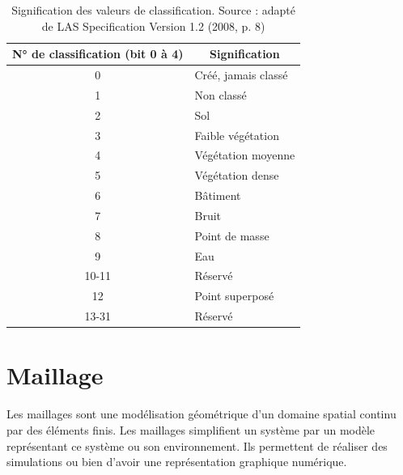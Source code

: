 \begin{table}[htbp!]
\centering
\begin{tabular}{|c|l|}
\hline
\textbf{N° de classification (bit 0 à 4)} & \multicolumn{1}{c|}{\textbf{Signification}} \\ \hline
0                                         & Créé, jamais classé                         \\ \hline
1                                         & Non classé                                  \\ \hline
2                                         & Sol                                         \\ \hline
3                                         & Faible végétation                           \\ \hline
4                                         & Végétation moyenne                          \\ \hline
5                                         & Végétation dense                            \\ \hline
6                                         & Bâtiment                                    \\ \hline
7                                         & Bruit                                       \\ \hline
8                                         & Point de masse                              \\ \hline
9                                         & Eau                                         \\ \hline
10-11                                     & Réservé                                     \\ \hline
12                                        & Point superposé                             \\ \hline
13-31                                     & Réservé                                     \\ \hline
\end{tabular}
\caption{Signification des valeurs de classification. Source : adapté de LAS Specification Version 1.2 (2008, p. 8)}
\label{tab:las_point_class_meaning}
\end{table}

\section{Maillage}
Les maillages sont une modélisation géométrique d'un domaine spatial continu
par des éléments finis.
Les maillages simplifient un système par un modèle représentant ce système
ou son environnement. Ils permettent de réaliser des simulations ou bien d'avoir
une représentation graphique numérique.

